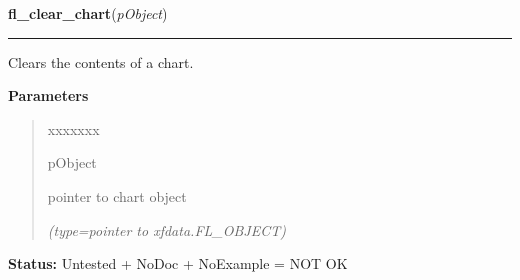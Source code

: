     \label{xformslib:library:fl_clear_chart}

    \vspace{0.5ex}

\hspace{.8\funcindent}\begin{boxedminipage}{\funcwidth}

    \raggedright \textbf{fl\_clear\_chart}(\textit{pObject})

    \vspace{-1.5ex}

    \rule{\textwidth}{0.5\fboxrule}
\setlength{\parskip}{2ex}
    Clears the contents of a chart.

\setlength{\parskip}{1ex}
      \textbf{Parameters}
      \vspace{-1ex}

      \begin{quote}
        \begin{Ventry}{xxxxxxx}

          \item[pObject]

          pointer to chart object

            {\it (type=pointer to xfdata.FL\_OBJECT)}

        \end{Ventry}

      \end{quote}

\textbf{Status:} Untested + NoDoc + NoExample = NOT OK



    \end{boxedminipage}

    \label{xformslib:library:fl_add_chart_value}

    \vspace{0.5ex}

